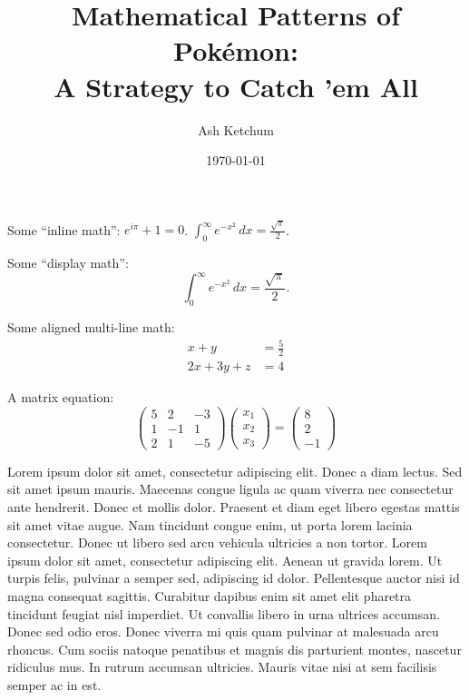 \documentclass{article}
\title{Mathematical Patterns of Pok\'emon:\\A Strategy to Catch 'em All}
\author{Ash Ketchum}
\date{\today}
\begin{document}
\maketitle


Some ``inline math'': $e^{i\pi} + 1 = 0$.  
$\int_{0}^{\infty} e^{-x^2} \, dx = \frac{\sqrt{\pi}}{2}$.

Some ``display math'':
\begin{equation}
  \int_{0}^{\infty} e^{-x^2} \, dx = \frac{\sqrt{\pi}}{2}.
\end{equation}

Some aligned multi-line math:
\begin{align}
 x+y &= \frac{5}{2}
 \\ %
 2x + 3y + z &= 4
\end{align}

A matrix equation:
\begin{equation}
  \left(
    \begin{array}{ccc} %
     5 & 2  & -3 \\
     1 & -1 & 1 \\
     2 & 1  & -5
    \end{array}
  \right)
      \left(
    \begin{array}{ccc} %
     x_1\\
     x_2\\
     x_3
    \end{array}
  \right)
  =
    \left(
    \begin{array}{ccc} %
     8\\
     2\\
     -1
    \end{array}
  \right)
\end{equation}


Lorem ipsum dolor sit amet, consectetur adipiscing elit.
Donec a diam lectus.
Sed sit amet ipsum mauris.
Maecenas congue ligula ac quam viverra nec consectetur ante hendrerit.
Donec et mollis dolor.
Praesent et diam eget libero egestas mattis sit amet vitae augue.
Nam tincidunt congue enim, ut porta lorem lacinia consectetur.
Donec ut libero sed arcu vehicula ultricies a non tortor.
Lorem ipsum dolor sit amet, consectetur adipiscing elit.
Aenean ut gravida lorem.
Ut turpis felis, pulvinar a semper sed, adipiscing id dolor.
Pellentesque auctor nisi id magna consequat sagittis.
Curabitur dapibus enim sit amet elit pharetra tincidunt feugiat nisl imperdiet.
Ut convallis libero in urna ultrices accumsan.
Donec sed odio eros.
Donec viverra mi quis quam pulvinar at malesuada arcu rhoncus.
Cum sociis natoque penatibus et magnis dis parturient montes, nascetur ridiculus mus.
In rutrum accumsan ultricies.
Mauris vitae nisi at sem facilisis semper ac in est.
\end{document}
